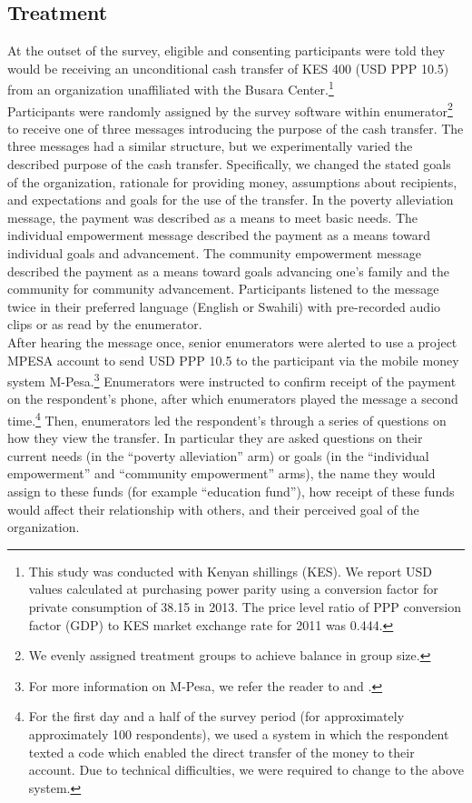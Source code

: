 \documentclass[11pt, a4paper]{article}\usepackage[]{graphicx}\usepackage[]{color}
\begin{document}
    \subsection{Treatment}

        At the outset of the survey, eligible and consenting participants were told they would be receiving an unconditional cash transfer of KES 400 (USD PPP 10.5) from an organization unaffiliated with the Busara Center.\footnote{This study was conducted with Kenyan shillings (KES). We report USD values calculated at purchasing power parity using a conversion factor for private consumption of 38.15 in 2013. The price level ratio of PPP conversion factor (GDP) to KES market exchange rate for 2011 was 0.444.} \\

        Participants were randomly assigned by the survey software within enumerator\footnote{We evenly assigned treatment groups to achieve balance in group size.} to receive one of three messages introducing the purpose of the cash transfer. The three messages had a similar structure, but we experimentally varied the described purpose of the cash transfer. Specifically, we changed the stated goals of the organization, rationale for providing money, assumptions about recipients, and expectations and goals for the use of the transfer. In the poverty alleviation message, the payment was described as a means to meet basic needs. The individual empowerment message described the payment as a means toward individual goals and advancement. The community empowerment message described the payment as a means toward goals advancing one's family and the community for community advancement. Participants listened to the message twice in their preferred language (English or Swahili) with pre-recorded audio clips or as read by the enumerator. \\

        After hearing the message once, senior enumerators were alerted to use a project MPESA account to send USD PPP 10.5 to the participant via the mobile money system M-Pesa.\footnote{For more information on M-Pesa, we refer the reader to \textcite{jack_mobile_2011} and \textcite{mbiti_mobile_2011}.} Enumerators were instructed to confirm receipt of the payment on the respondent's phone, after which enumerators played the message a second time.\footnote{For the first day and a half of the survey period (for approximately approximately 100 respondents), we used a system in which the respondent texted a code which enabled the direct transfer of the money to their account. Due to technical difficulties, we were required to change to the above system.} Then, enumerators led the respondent's through a series of questions on how they view the transfer. In particular they are asked questions on their current needs (in the ``poverty alleviation'' arm) or goals (in the ``individual empowerment'' and ``community empowerment'' arms), the name they would assign to these funds (for example ``education fund''), how receipt of these funds would affect their relationship with others, and their perceived goal of the organization. \\
\end{document}
